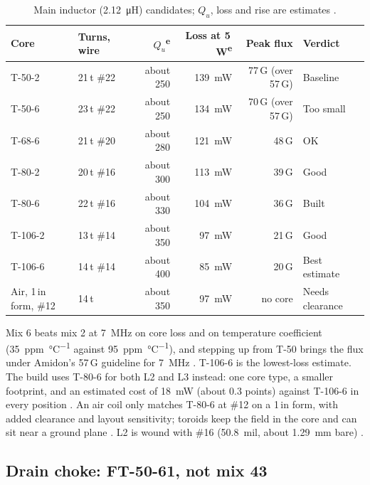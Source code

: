 \documentclass[11pt,letterpaper]{article}
\newcommand{\est}{\textsuperscript{e}}
\begin{document}
\begin{table}[h]
\centering\small
\caption{Main inductor (\SI{2.12}{\micro\henry}) candidates; $Q_u$, loss and rise are estimates \cite{projnotes,micrometalsT80,amidon135}.}\label{tab:l2cores}
\begin{tabular}{@{}llrrrl@{}}
\toprule
Core & Turns, wire & $Q_u$\est & Loss at 5\,W\est & Peak flux & Verdict \\ \midrule
T-50-2 & 21\,t \#22 & about 250 & \SI{139}{\milli\watt} & 77\,G (over 57\,G) & Baseline \\
T-50-6 & 23\,t \#22 & about 250 & \SI{134}{\milli\watt} & 70\,G (over 57\,G) & Too small \\
T-68-6 & 21\,t \#20 & about 280 & \SI{121}{\milli\watt} & 48\,G & OK \\
T-80-2 & 20\,t \#16 & about 300 & \SI{113}{\milli\watt} & 39\,G & Good \\
T-80-6 & 22\,t \#16 & about 330 & \SI{104}{\milli\watt} & 36\,G & Built \\
T-106-2 & 13\,t \#14 & about 350 & \SI{97}{\milli\watt} & 21\,G & Good \\
T-106-6 & 14\,t \#14 & about 400 & \SI{85}{\milli\watt} & 20\,G & Best estimate \\
Air, 1\,in form, \#12 & 14\,t & about 350 & \SI{97}{\milli\watt} & no core & Needs clearance \\
\bottomrule
\end{tabular}
\end{table}

Mix 6 beats mix 2 at \SI{7}{\mega\hertz} on core loss and on temperature coefficient (\SI{+35}{ppm\per\celsius} against \SI{+95}{ppm\per\celsius}), and stepping up from T-50 brings the flux under Amidon's 57\,G guideline for \SI{7}{\mega\hertz} \cite{projnotes,amidon135}. T-106-6 is the lowest-loss estimate. The build uses T-80-6 for both L2 and L3 instead: one core type, a smaller footprint, and an estimated cost of \SI{18}{\milli\watt} (about 0.3 points) against T-106-6 in every position \cite{projnotes}. An air coil only matches T-80-6 at \#12 on a 1\,in form, with added clearance and layout sensitivity; toroids keep the field in the core and can sit near a ground plane \cite[p.~3.32]{emrfd}. L2 is wound with \#16 (\SI{50.8}{mil}, about \SI{1.29}{\milli\meter} bare) \cite[Table 22.44, p.~22.39]{arrl2023}.

\subsection{Drain choke: FT-50-61, not mix 43}\label{sec:choke}
\end{document}
